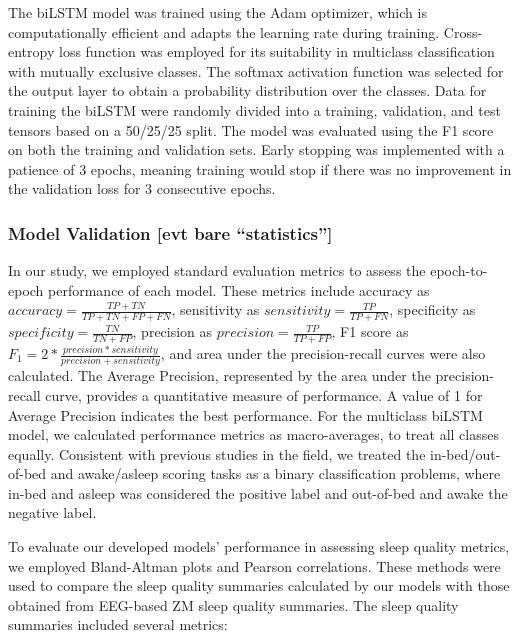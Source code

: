 \documentclass[
  super,
  preprint,
  3p]{elsarticle}
\begin{document}
The biLSTM model was trained using the Adam optimizer, which is
computationally efficient and adapts the learning rate during training.
Cross-entropy loss function was employed for its suitability in
multiclass classification with mutually exclusive classes. The softmax
activation function was selected for the output layer to obtain a
probability distribution over the classes. Data for training the biLSTM
were randomly divided into a training, validation, and test tensors
based on a 50/25/25 split. The model was evaluated using the F1 score on
both the training and validation sets. Early stopping was implemented
with a patience of 3 epochs, meaning training would stop if there was no
improvement in the validation loss for 3 consecutive epochs.

\hypertarget{model-validation-evt-bare-statistics}{%
\subsubsection{Model Validation {[}evt bare
``statistics''{]}}\label{model-validation-evt-bare-statistics}}

In our study, we employed standard evaluation metrics to assess the
epoch-to-epoch performance of each model. These metrics include accuracy
as \(accuracy = \frac{TP+TN}{TP+TN+FP+FN}\), sensitivity as
\(sensitivity = \frac{TP}{TP+FN}\), specificity as
\(specificity = \frac{TN}{TN+FP}\), precision as
\(precision = \frac{TP}{TP+FP}\), F1 score as
\(F_1 = 2 * \frac{precision * sensitivity}{precision + sensitivity}\),
and area under the precision-recall curves were also calculated. The
Average Precision, represented by the area under the precision-recall
curve, provides a quantitative measure of performance. A value of 1 for
Average Precision indicates the best performance. For the multiclass
biLSTM model, we calculated performance metrics as macro-averages, to
treat all classes equally. Consistent with previous studies in the
field\citep{hjorth2012, kushida2001}, we treated the in-bed/out-of-bed
and awake/asleep scoring tasks as a binary classification problems,
where in-bed and asleep was considered the positive label and out-of-bed
and awake the negative label.

To evaluate our developed models' performance in assessing sleep quality
metrics, we employed Bland-Altman plots and Pearson correlations. These
methods were used to compare the sleep quality summaries calculated by
our models with those obtained from EEG-based ZM sleep quality
summaries. The sleep quality summaries included several metrics:
\end{document}
